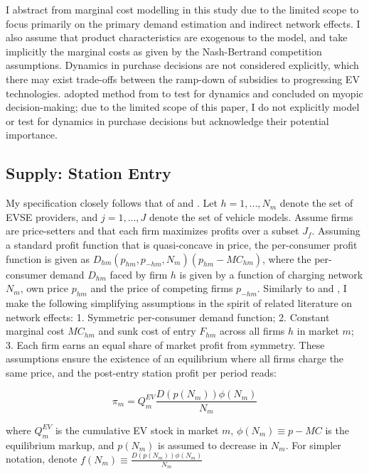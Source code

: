 \documentclass[12pt]{article}
\begin{document}
I abstract from marginal cost modelling in this study due to the limited scope to focus primarily on the primary demand estimation and indirect network effects.
I also assume that product characteristics are exogenous to the model, and take implicitly the marginal costs as given by the Nash-Bertrand competition assumptions.
Dynamics in purchase decisions are not considered explicitly, which there may exist trade-offs between the ramp-down of subsidies to progressing EV technologies.
\citet{springel_network_2021} adopted method from \citet{de_groote_subsidies_2019} to test for dynamics and concluded on myopic decision-making;
due to the limited scope of this paper, I do not explicitly model or test for dynamics in purchase decisions but acknowledge their potential importance.

    \subsection{Supply: Station Entry}
    \hspace*{\parindent}My specification closely follows that of \citet{springel_network_2021} and \citet{remmy_adjustable_2024}. Let $h = 1, ..., N_{m}$ denote the set of EVSE providers, and $j = 1,...,J$ denote the set of vehicle models. 
Assume firms are price-setters and that each firm maximizes profits over a subset $J_f$.
Assuming a standard profit function that is quasi-concave in price, the per-consumer profit function is given as $D_{hm}(p_{hm}, p_{-hm}, N_{m}) (p_{hm} - MC_{hm})$, where the per-consumer demand $D_{hm}$ faced by firm $h$ is given by a function of charging network $N_m$, 
own price $p_{hm}$ and the price of competing firms $p_{-hm}$. Similarly to \citet{springel_network_2021} and \citet{remmy_adjustable_2024}, I make the following simplifying assumptions in the spirit of related literature on network effects: 
    1. Symmetric per-consumer demand function;
    2. Constant marginal cost $MC_{hm}$ and sunk cost of entry $F_{hm} $ across all firms $h$ in market $m$;
    3. Each firm earns an equal share of market profit from symmetry.
These assumptions ensure the existence of an equilibrium where all firms charge the same price, and the post-entry station profit per period reads:

\begin{equation}
    \pi_{m} = Q_{m}^{EV} \frac{D(p(N_m)) \phi(N_m)} {N_m}
\end{equation}

where $Q_{m}^{EV}$ is the cumulative EV stock in market $m$, $\phi(N_m) \equiv p - MC$ is the equilibrium markup, and $p(N_m)$ is assumed to decrease in $N_m$. For simpler notation, denote $f(N_m) \equiv \frac{D(p(N_m)) \phi(N_m)} {N_m}$ 
\end{document}
